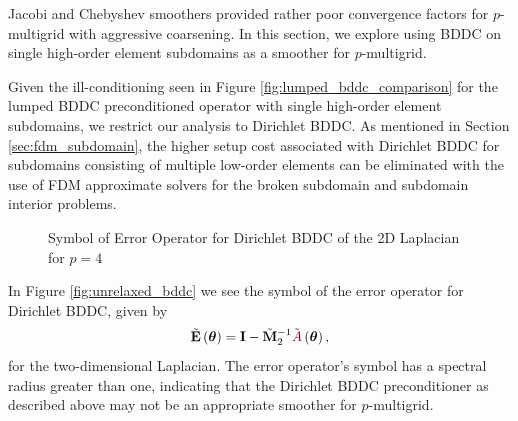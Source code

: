Jacobi and Chebyshev smoothers provided rather poor convergence factors for $p$-multigrid with aggressive coarsening.
In this section, we explore using BDDC on single high-order element subdomains as a smoother for $p$-multigrid.

Given the ill-conditioning seen in Figure \ref{fig:lumped_bddc_comparison} for the lumped BDDC preconditioned operator with single high-order element subdomains, we restrict our analysis to Dirichlet BDDC.
As mentioned in Section \ref{sec:fdm_subdomain}, the higher setup cost associated with Dirichlet BDDC for subdomains consisting of multiple low-order elements can be eliminated with the use of FDM approximate solvers for the broken subdomain and subdomain interior problems.

\begin{figure}[!ht]
  \centering
  \hfill
  \caption{Symbol of Error Operator for Dirichlet BDDC of the 2D Laplacian for $p = 4$}
\end{figure}

In Figure \ref{fig:unrelaxed_bddc} we see the symbol of the error operator for Dirichlet BDDC, given by
\begin{equation}
\tilde{\mathbf{E}} \left( \boldsymbol{\theta} \right) = \mathbf{I} - \tilde{\mathbf{M}}_2^{-1} \tilde{{\color{burgundy}A}} \left( \boldsymbol{\theta} \right),
\end{equation}
for the two-dimensional Laplacian.
The error operator's symbol has a spectral radius greater than one, indicating that the Dirichlet BDDC preconditioner as described above may not be an appropriate smoother for $p$-multigrid.

